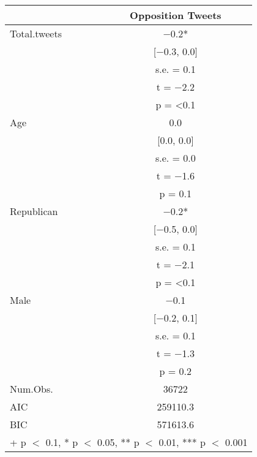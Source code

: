 \begin{table}
\centering
\begin{tabular}[t]{lc}
\toprule
  & Opposition Tweets\\
\midrule
Total.tweets & \num{-0.2}*\\
 & {}[\num{-0.3}, \num{0.0}]\\
 & s.e. = \vphantom{2} \num{0.1}\\
 & t = \num{-2.2}\\
 & p = \vphantom{1} \num{<0.1}\\
Age & \num{0.0}\\
 & {}[\num{0.0}, \num{0.0}]\\
 & s.e. = \num{0.0}\\
 & t = \num{-1.6}\\
 & p = \num{0.1}\\
Republican & \num{-0.2}*\\
 & {}[\num{-0.5}, \num{0.0}]\\
 & s.e. = \vphantom{1} \num{0.1}\\
 & t = \num{-2.1}\\
 & p = \num{<0.1}\\
Male & \num{-0.1}\\
 & {}[\num{-0.2}, \num{0.1}]\\
 & s.e. = \num{0.1}\\
 & t = \num{-1.3}\\
 & p = \num{0.2}\\
\midrule
Num.Obs. & \num{36722}\\
AIC & \num{259110.3}\\
BIC & \num{571613.6}\\
\bottomrule
\multicolumn{2}{l}{\rule{0pt}{1em}+ p $<$ 0.1, * p $<$ 0.05, ** p $<$ 0.01, *** p $<$ 0.001}\\
\end{tabular}
\end{table}

